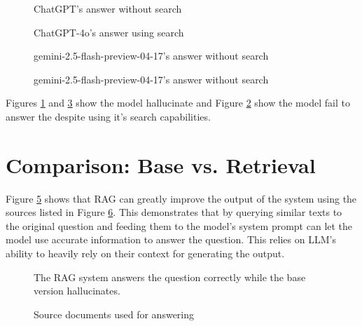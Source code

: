 \documentclass{article}
\begin{document}
\begin{figure}[H]
    \centering
    \caption{ChatGPT's answer without search}
    \label{fig:gpt}
\end{figure}

\begin{figure}[H]
    \centering
    \caption{ChatGPT-4o's answer using search}
    \label{fig:gpt40}
\end{figure}

\begin{figure}[H]
    \centering
    \caption{gemini-2.5-flash-preview-04-17's answer without search}
    \label{fig:gemini}
\end{figure}

\begin{figure}[H]
    \centering
    \caption{gemini-2.5-flash-preview-04-17's answer without search}
    \label{fig:enter-label}
\end{figure}

Figures \ref{fig:gpt} and \ref{fig:gemini} show the model hallucinate and Figure \ref{fig:gpt40} show the model fail to answer the despite using it's search capabilities.

\section{Comparison: Base vs. Retrieval}
    Figure \ref{fig:finn} shows that RAG can greatly improve the output of the system using the sources listed in Figure \ref{fig:sources}. This demonstrates that by querying similar texts to the original question and feeding them to the model's system prompt can let the model use accurate information to answer the question. This relies on LLM's ability to heavily rely on their context for generating the output.

    \begin{figure}[H]
        \centering
        \caption{The RAG system answers the question correctly while the base version hallucinates.}
        \label{fig:finn}
    \end{figure}

    \begin{figure}[H]
        \centering
        \caption{Source documents used for answering}
        \label{fig:sources}
    \end{figure}
\end{document}
